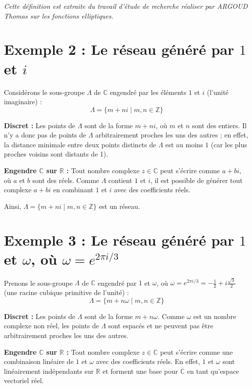 \documentclass[12pt]{article}
\begin{document}
\textit{Cette définition est extraite du travail d'étude de recherche réaliser par ARGOUD Thomas sur les fonctions elliptiques.}
\section*{Exemple 2 : Le réseau généré par \(1\) et \(i\)}

Considérons le sous-groupe \(\Lambda\) de \(\mathbb{C}\) engendré par les éléments \(1\) et \(i\) (l'unité imaginaire) :
\[
\Lambda = \{ m + ni \mid m, n \in \mathbb{Z} \}
\]

\textbf{Discret :} Les points de \(\Lambda\) sont de la forme \(m + ni\), où \(m\) et \(n\) sont des entiers. Il n'y a donc pas de points de \(\Lambda\) arbitrairement proches les uns des autres ; en effet, la distance minimale entre deux points distincts de \(\Lambda\) est au moins \(1\) (car les plus proches voisins sont distants de 1).

\textbf{Engendre \(\mathbb{C}\) sur \(\mathbb{R}\) :} Tout nombre complexe \(z \in \mathbb{C}\) peut s'écrire comme \(a + bi\), où \(a\) et \(b\) sont des réels. Comme \(\Lambda\) contient \(1\) et \(i\), il est possible de générer tout complexe \(a + bi\) en combinant \(1\) et \(i\) avec des coefficients réels.

Ainsi, \(\Lambda = \{ m + ni \mid m, n \in \mathbb{Z} \}\) est un réseau.

\section*{Exemple 3 : Le réseau généré par \(1\) et \(\omega\), où \(\omega = e^{2\pi i / 3}\)}

Prenons le sous-groupe \(\Lambda\) de \(\mathbb{C}\) engendré par \(1\) et \(\omega\), où \(\omega = e^{2\pi i / 3} = -\frac{1}{2} + i\frac{\sqrt{3}}{2}\) (une racine cubique primitive de l'unité) :
\[
\Lambda = \{ m + n\omega \mid m, n \in \mathbb{Z} \}
\]

\textbf{Discret :} Les points de \(\Lambda\) sont de la forme \(m + n\omega\). Comme \(\omega\) est un nombre complexe non réel, les points de \(\Lambda\) sont espacés et ne peuvent pas être arbitrairement proches les uns des autres.

\textbf{Engendre \(\mathbb{C}\) sur \(\mathbb{R}\) :} Tout nombre complexe \(z \in \mathbb{C}\) peut s'écrire comme une combinaison linéaire de \(1\) et \(\omega\) avec des coefficients réels. En effet, \(1\) et \(\omega\) sont linéairement indépendants sur \(\mathbb{R}\) et forment une base pour \(\mathbb{C}\) en tant qu'espace vectoriel réel.
\end{document}
